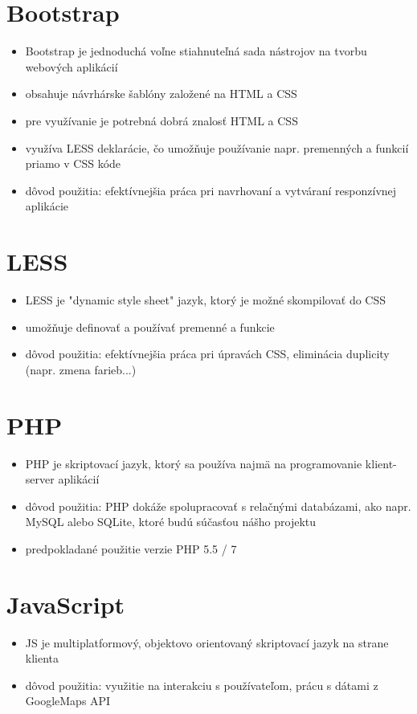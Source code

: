 \documentclass[12pt,a4paper]{report}
\theoremstyle{definition}
\theoremstyle{remark}
\begin{document}
\section{Bootstrap}
\begin{itemize}
\item Bootstrap je jednoduchá voľne stiahnuteľná sada nástrojov na tvorbu webových aplikácií
\item obsahuje návrhárske šablóny založené na HTML a CSS
\item pre využívanie je potrebná dobrá znalosť HTML a CSS
\item využíva LESS deklarácie, čo umožňuje používanie napr. premenných a funkcií priamo v CSS kóde
\item dôvod použitia: efektívnejšia práca pri navrhovaní a vytváraní responzívnej aplikácie
\end{itemize}

\section{LESS}
\begin{itemize}
\item LESS je "dynamic style sheet"  jazyk, ktorý je možné skompilovať do CSS
\item umožňuje definovať a používať premenné a funkcie
\item dôvod použitia: efektívnejšia práca pri úpravách CSS, eliminácia duplicity (napr. zmena farieb...)
\end{itemize}

\section{PHP}
\begin{itemize}
\item PHP je skriptovací jazyk, ktorý sa používa najmä na programovanie klient-server aplikácií
\item dôvod použitia: PHP dokáže spolupracovať s relačnými databázami, ako napr. MySQL alebo SQLite, ktoré budú súčasťou nášho projektu
\item predpokladané použitie verzie PHP 5.5 / 7
\end{itemize}

\section{JavaScript}
\begin{itemize}
\item JS je multiplatformový, objektovo orientovaný skriptovací jazyk na strane klienta
\item dôvod použitia: využitie na interakciu s používateľom, prácu s dátami z GoogleMaps API 
\end{itemize}
\end{document}
